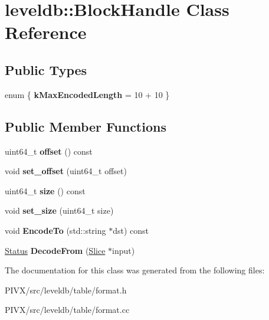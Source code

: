 \hypertarget{classleveldb_1_1_block_handle}{}\section{leveldb\+:\+:Block\+Handle Class Reference}
\label{classleveldb_1_1_block_handle}
\subsection*{Public Types}
\begin{DoxyCompactItemize}
\item 
\mbox{\label{classleveldb_1_1_block_handle_a63d4b12a32c670d18b74a2ff9451da28}} 
enum \{ {\bfseries k\+Max\+Encoded\+Length} = 10 + 10
 \}
\end{DoxyCompactItemize}
\subsection*{Public Member Functions}
\begin{DoxyCompactItemize}
\item 
\mbox{\label{classleveldb_1_1_block_handle_adb071cded811275424d2cf33757d42e5}} 
uint64\+\_\+t {\bfseries offset} () const
\item 
\mbox{\label{classleveldb_1_1_block_handle_ae6dad857a4f7f5e051762f874f0050bc}} 
void {\bfseries set\+\_\+offset} (uint64\+\_\+t offset)
\item 
\mbox{\label{classleveldb_1_1_block_handle_a82b79636d23162c441fb33b71849371d}} 
uint64\+\_\+t {\bfseries size} () const
\item 
\mbox{\label{classleveldb_1_1_block_handle_a47a4169dce3026122b76d594453b78a8}} 
void {\bfseries set\+\_\+size} (uint64\+\_\+t size)
\item 
\mbox{\label{classleveldb_1_1_block_handle_aed011eeca92f0852caa106a34c3a80e6}} 
void {\bfseries Encode\+To} (std\+::string $\ast$dst) const
\item 
\mbox{\label{classleveldb_1_1_block_handle_a1660fd202984d8d5bfa4bed6c5613621}} 
\mbox{\hyperlink{classleveldb_1_1_status}{Status}} {\bfseries Decode\+From} (\mbox{\hyperlink{classleveldb_1_1_slice}{Slice}} $\ast$input)
\end{DoxyCompactItemize}


The documentation for this class was generated from the following files\+:\begin{DoxyCompactItemize}
\item 
P\+I\+V\+X/src/leveldb/table/format.\+h\item 
P\+I\+V\+X/src/leveldb/table/format.\+cc\end{DoxyCompactItemize}
